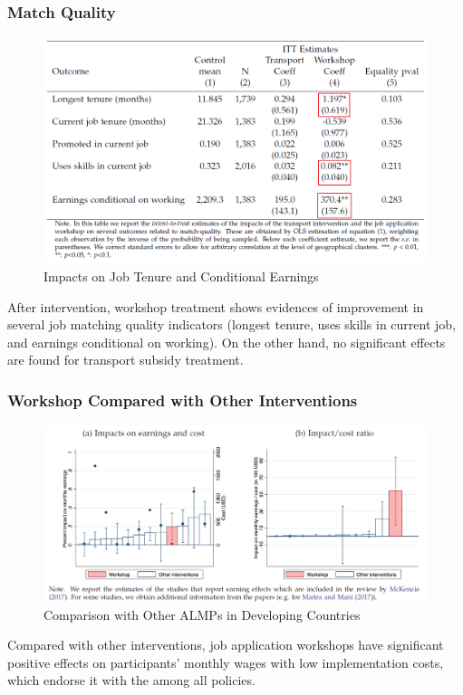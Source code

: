         \subsubsection{Match Quality}
            \begin{figure}[H]
                \centering
                \includegraphics[width=4.5in]{images/ch6/Abebe result 4 matching quality.png}
                \caption{Impacts on Job Tenure and Conditional Earnings}
            \end{figure}
            After intervention, workshop treatment shows evidences of improvement in several job matching quality indicators (longest tenure, uses skills in current job, and earnings conditional on working). On the other hand, no significant effects are found for transport subsidy treatment.
            
        \subsubsection{Workshop Compared with Other Interventions}
            \begin{figure}[H]
                \centering
                \includegraphics[width=5.5in]{images/ch6/Abebe result 5 compare with other policies.png}
                \caption{Comparison with Other ALMPs in Developing Countries}
            \end{figure}
            Compared with other interventions, job application workshops have significant positive effects on participants' monthly wages with low implementation costs, which endorse it with the  among all policies.
            
